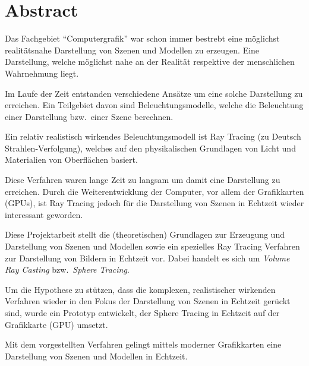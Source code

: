 
\chapter*{Abstract}
\label{chap:abstract}

Das Fachgebiet ``Computergrafik'' war schon immer bestrebt eine
möglichst realitätsnahe Darstellung von Szenen und Modellen zu erzeugen.
Eine Darstellung, welche möglichst nahe an der Realität respektive der
menschlichen Wahrnehmung liegt.

Im Laufe der Zeit entstanden verschiedene Ansätze um eine solche
Darstellung zu erreichen. Ein Teilgebiet davon sind Beleuchtungsmodelle,
welche die Beleuchtung einer Darstellung bzw.~einer Szene berechnen.

Ein relativ realistisch wirkendes Beleuchtungsmodell ist Ray Tracing (zu
Deutsch Strahlen-Verfolgung), welches auf den physikalischen Grundlagen
von Licht und Materialien von Oberflächen basiert.

Diese Verfahren waren lange Zeit zu langsam um damit eine Darstellung zu
erreichen. Durch die Weiterentwicklung der Computer, vor allem der
Grafikkarten (GPUs), ist Ray Tracing jedoch für die Darstellung von
Szenen in Echtzeit wieder interessant geworden.

Diese Projektarbeit stellt die (theoretischen) Grundlagen zur Erzeugung
und Darstellung von Szenen und Modellen sowie ein spezielles Ray Tracing
Verfahren zur Darstellung von Bildern in Echtzeit vor. Dabei handelt es
sich um \textit{Volume Ray Casting} bzw.~\textit{Sphere Tracing}.

Um die Hypothese zu stützen, dass die komplexen, realistischer wirkenden
Verfahren wieder in den Fokus der Darstellung von Szenen in Echtzeit
gerückt sind, wurde ein Prototyp entwickelt, der Sphere Tracing in
Echtzeit auf der Grafikkarte (GPU) umsetzt.

Mit dem vorgestellten Verfahren gelingt mittels moderner Grafikkarten
eine Darstellung von Szenen und Modellen in Echtzeit.
